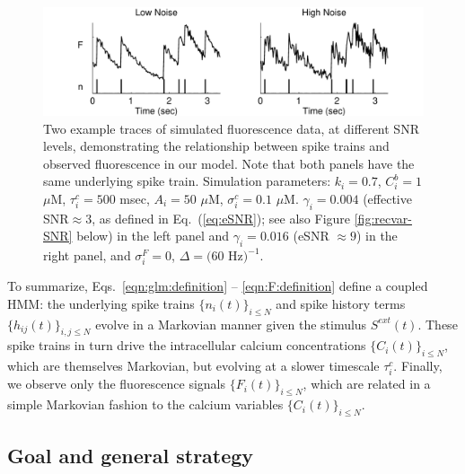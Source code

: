 \documentclass[aoas,preprint]{imsart}
\begin{document}
\begin{figure}
\centering \includegraphics[width=\hsize]{../figs/sim_examples}
\caption{Two example traces of simulated fluorescence data, at
  different SNR levels, demonstrating the relationship between spike
  trains and observed fluorescence in our model.  Note that both
  panels have the same underlying spike train. Simulation parameters:
  $k_i=0.7$, $C_i^b=1$ $\mu$M, $\tau^c_i=500$ msec, $A_i=50$ $\mu$M,
  $\sigma^c_i=0.1$ $\mu$M. $\gamma_i=0.004$ (effective SNR$ \approx
  3$, as defined in Eq.~(\ref{eq:eSNR}); see also Figure
  \ref{fig:recvar-SNR} below) in the left panel and $\gamma_i=0.016$
  (eSNR $\approx 9$) in the right panel, and $\sigma^F_i=0$,
  $\Delta=(60$ Hz$)^{-1}$.}
\label{fig:example_traces}
\end{figure}

To summarize, Eqs.~\eqref{eqn:glm:definition} -- \eqref{eqn:F:definition} define a coupled HMM: the underlying spike trains $\{n_i(t)\}_{i\leq N}$ and spike history terms $\{h_{ij}(t)\}_{i,j\leq N}$ evolve in a Markovian manner given the stimulus $S^{ext}(t)$. These spike trains in turn drive the intracellular calcium concentrations $\{C_i(t)\}_{i\leq N}$, which are themselves Markovian, but evolving at a slower timescale $\tau_i^c$. Finally, we observe only the fluorescence signals $\{F_i(t)\}_{i\leq N}$, which are related in a simple Markovian fashion to the calcium variables $\{C_i(t)\}_{i\leq N}$.


\subsection{Goal and general strategy}  \label{sec:methods:goal}
\end{document}
